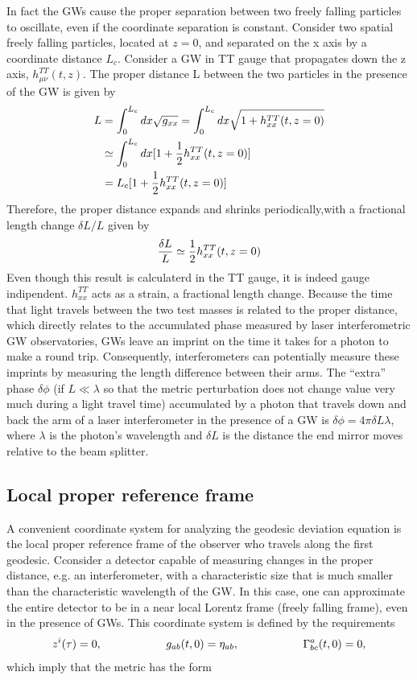 \documentclass[binding=0.6cm, LaM]{sapthesis}
\begin{document}
In fact the GWs cause the
proper separation between two freely falling particles to oscillate, even if the coordinate
separation is constant. Consider two spatial freely falling particles, located at $z = 0$, and separated on the x axis by a coordinate distance $L_c$. Consider a GW in TT gauge that propagates down the z axis, $h^{TT}_{\mu\nu}(t,z)$. The proper distance L between the two particles in the presence of the GW is given by
\begin{align}
L & = \int^{L_c}_{0}{dx\sqrt{g_{xx}}} = \int^{L_c}_{0}dx\sqrt{1 + h^{TT}_{xx}(t,z=0)} \\
 & \simeq \int^{L_c}_{0}{dx[1 + {1 \over 2}h^{TT}_{xx}(t,z=0)]} \\
&= L_c[1 + {1 \over 2}h^{TT}_{xx}(t,z=0)]
\end{align}
Therefore, the proper distance expands and shrinks periodically,with a fractional length change $\delta L/L$ given by
\begin{equation}
{{\delta L}\over{L}} \simeq {1 \over 2} h_{xx}^{TT}(t,z=0)
\end{equation}
Even though this result is calculaterd in the TT gauge, it is indeed gauge indipendent.
$h_{xx}^{TT}$ acts as a strain, a fractional length change.
 Because the time that light travels between the two test masses is related to the proper distance,  which directly relates to the accumulated phase measured by laser interferometric GW observatories,
 GWs leave an imprint on the time it takes for a photon to make a round trip. Consequently, interferometers can potentially measure these imprints by measuring the length difference between 
their arms. The “extra” phase $\delta \phi$ (if $L \ll \lambda$ so that the metric perturbation does not change value very much during a light travel time) accumulated by a photon that travels 
down and back the arm of a laser interferometer in the presence of a GW is $\delta \phi = 4\pi \delta L \lambda$, where $\lambda$ is the photon’s wavelength and $\delta L$ is the distance 
the end mirror moves relative to the beam splitter. 




\subsection{Local proper reference frame}

A convenient coordinate system for analyzing the geodesic deviation equation is the local proper reference frame of the observer who travels along the first geodesic. 
Cconsider a detector capable of measuring changes in the proper distance, e.g. an interferometer, with a characteristic size that is much smaller than the characteristic wavelength of the GW. 
In this case, one can approximate the entire detector to be in a near local Lorentz frame  (freely falling frame), even in the presence of GWs. This coordinate system is defined by the requirements
\begin{equation}
z^i(\tau) = 0, \hspace*{2cm} g_{ab}(t, 0) = \eta_{ab}, \hspace*{2cm} \Gamma^a_{bc}(t,0) = 0,
\end{equation}
which imply that the metric has the form
\end{document}
